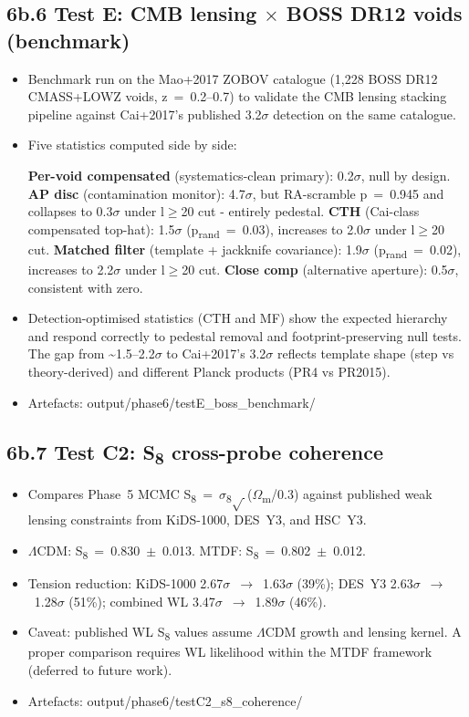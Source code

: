 \documentclass[11pt,a4paper]{article}
\begin{document}
\subsection{6b.6 Test E: CMB lensing $\times$ BOSS DR12 voids (benchmark)}
\begin{itemize}
  \item Benchmark run on the Mao+2017 ZOBOV catalogue (1,228 BOSS DR12 CMASS+LOWZ voids, z~=~0.2--0.7) to validate the CMB lensing stacking pipeline against Cai+2017's published 3.2$\sigma$ detection on the same catalogue.
  \item Five statistics computed side by side:
    
\textbf{Per-void compensated} (systematics-clean primary): 0.2$\sigma$, null by design.
\textbf{AP disc} (contamination monitor): 4.7$\sigma$, but RA-scramble p~=~0.945 and collapses to 0.3$\sigma$ under l$\ge$20 cut  -  entirely pedestal.
\textbf{CTH} (Cai-class compensated top-hat): 1.5$\sigma$ (p\textsubscript{rand}~=~0.03), increases to 2.0$\sigma$ under l$\ge$20 cut.
\textbf{Matched filter} (template + jackknife covariance): 1.9$\sigma$ (p\textsubscript{rand}~=~0.02), increases to 2.2$\sigma$ under l$\ge$20 cut.
\textbf{Close comp} (alternative aperture): 0.5$\sigma$, consistent with zero.
  \item Detection-optimised statistics (CTH and MF) show the expected hierarchy and respond correctly to pedestal removal and footprint-preserving null tests. The gap from \~{}1.5--2.2$\sigma$ to Cai+2017's 3.2$\sigma$ reflects template shape (step vs theory-derived) and different Planck products (PR4 vs PR2015).
  \item Artefacts: output/\allowbreak{}phase6/\allowbreak{}testE\_\allowbreak{}boss\_\allowbreak{}benchmark/\allowbreak{}
\end{itemize}

\subsection{6b.7 Test C2: S\textsubscript{8} cross-probe coherence}
\begin{itemize}
  \item Compares Phase~5 MCMC S\textsubscript{8}~=~$\sigma$\textsubscript{8}$\sqrt{\,}$($\Omega$\textsubscript{m}/0.3) against published weak lensing constraints from KiDS-1000, DES~Y3, and HSC~Y3.
  \item $\Lambda$CDM: S\textsubscript{8}~=~0.830~$\pm$~0.013. MTDF: S\textsubscript{8}~=~0.802~$\pm$~0.012.
  \item Tension reduction: KiDS-1000 2.67$\sigma$~$\rightarrow$~1.63$\sigma$ (39\%); DES~Y3 2.63$\sigma$~$\rightarrow$~1.28$\sigma$ (51\%); combined WL 3.47$\sigma$~$\rightarrow$~1.89$\sigma$ (46\%).
  \item Caveat: published WL S\textsubscript{8} values assume $\Lambda$CDM growth and lensing kernel. A proper comparison requires WL likelihood within the MTDF framework (deferred to future work).
  \item Artefacts: output/\allowbreak{}phase6/\allowbreak{}testC2\_\allowbreak{}s8\_\allowbreak{}coherence/\allowbreak{}
\end{itemize}
\end{document}
